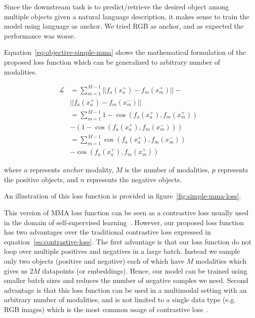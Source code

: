 \documentclass[11pt]{article}
\begin{document}
Since the downstream task is to predict/retrieve the desired object among multiple objects given a natural language description, it makes sense to train the model using language as anchor. 
We tried RGB as anchor, and as expected the performance was worse.

Equation~\ref{eq:objective-simple-mma} shows the mathematical formulation of the proposed loss function which can be generalized to arbitrary number of modalities.

\begin{equation}
\label{eq:objective-simple-mma}
\begin{split}
    \mathcal{L}  &= \sum_{m=1}^{M-1} || f_a(x_{a}^{+}) - f_m(x_{m}^{+}) || - \\ 
    & || f_a(x_{a}^{+}) -f_m(x_{m}^{-}) || 
    \\
    &= \sum_{m=1}^{M-1} 1 - \cos(f_a(x_{a}^{+}), f_m(x_{m}^{+})) \\ & - (1 - \cos(f_a(x_{a}^{+}) ,f_m(x_{m}^{-}))) \\
    &= \sum_{m=1}^{M-1} \cos(f_a(x_{a}^{+}) ,f_m(x_{m}^{-})) \\ 
    & - \cos(f_a(x_{a}^{+}), f_m(x_{m}^{+}))
\end{split}
\end{equation}

where $a$ represents \textit{anchor} modality, $M$ is the number of modalities, $p$ represents the positive objects, and $n$ represents the negative objects.

An illustration of this loss function is provided in figure~\ref{fig:simple-mma-loss}.

This version of MMA loss function can be seen as a contrastive loss usually used in the domain of self-supervised learning~\cite{chen2020simple}. However, our proposed loss function has two advantages over the traditional contrastive loss expressed in equation~\ref{eq:contrastive-loss}. The first advantage is that our loss function do not loop over multiple positives and negatives in a large batch. Instead we sample only two objects (positive and negative) each of which have $M$ modalities which gives us $2M$ datapoints (or embeddings). Hence, our model can be trained using smaller batch sizes and reduces the number of negative samples we need. Second advantage is that this loss function can be used in a multimodal setting with an arbitrary number of modalities, and is not limited to a single data type (e.g. RGB images) which is the most common usage of contrastive loss~\cite{chen2020simple, NEURIPS2020_supervised_contrastive}.
\end{document}
